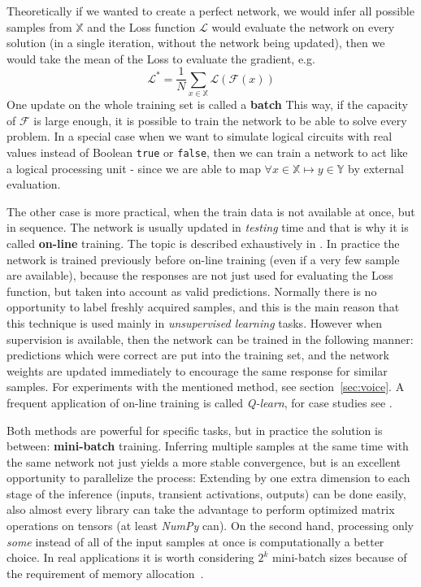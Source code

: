 Theoretically if we wanted to create a perfect network, we would infer all possible samples from $\mathbb{X}$ and the Loss function 
$\mathcal{L}$ would evaluate the network on every solution (in a single iteration, without the network being updated), 
then we would take the mean of the Loss to evaluate the gradient, e.g. 
$$\mathcal{L}^*=\frac{1}{N}\sum_{x \in \mathbb{X}}\mathcal{L}(\mathcal{F}(x))$$
One update on the whole training set is called a \textbf{batch}
This way, if the capacity of $\mathcal{F}$ is large enough, it is possible to train the network to be able to solve every problem.
In a special case when we want to simulate logical circuits with real values instead of Boolean \texttt{true} or \texttt{false},
then we can train a network to act like a logical processing unit - since we are able to map $\forall x \in \mathbb{X} \mapsto y \in \mathbb{Y}$ by 
external evaluation.

The other case is more practical, when the train data is not available at once, but in sequence.
The network is usually updated in \emph{testing} time and that is why it is called \textbf{on-line} training.
The topic is described exhaustively in \cite{onlinelearn}.
In practice the network is trained previously before on-line training (even if a very few sample are available), 
because the responses are not just used for evaluating the Loss function, but taken into account as valid predictions.
Normally there is no opportunity to label freshly acquired samples, 
and this is the main reason that this technique is used mainly in \emph{unsupervised learning} tasks.
However when supervision is available, then the network can be trained in the following manner:
predictions which were correct are put into the training set, 
and the network weights are updated immediately 
to encourage the same response for similar samples.
For experiments with the mentioned method, see section~\ref{sec:voice}.
A frequent application of on-line training is called \emph{Q-learn}, for case studies see \cite{qlearn-case}.

Both methods are powerful for specific tasks, but in practice the solution is between: \textbf{mini-batch} training.
Inferring multiple samples at the same time with the same network not just yields a more stable convergence, 
but is an excellent opportunity to parallelize the process:
Extending by one extra dimension to each stage of the inference (inputs, transient activations, outputs) can be done easily,
also almost every library can take the advantage to perform optimized matrix operations on tensors (at least \emph{NumPy} can).
On the second hand, processing only \emph{some} instead of all of the input samples at once is computationally a better choice.
In real applications it is worth considering $2^k$ mini-batch sizes because of the requirement of memory allocation~\cite{stanfordlectures}.

